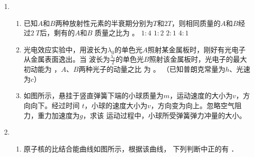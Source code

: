 



\begin{enumerate}
	\item
{}
\begin{enumerate}
	\item
已知$ A $和$ B $两种放射性元素的半衰期分别为$ T $和$ 2 T $，则相同质量的$ A $和$ B $经过$ 2 \ T $后，剩有的$ A $和$ B $
质量之比为  \underlinegap 。
\fourchoices
{$ 1:4 $}
{$ 1:2 $}
{$ 2:1 $}
{$ 4:1 $}



\item 
光电效应实验中，用波长为$ \lambda _{0} $的单色光$ A $照射某金属板时，刚好有光电子从金属表面逸出。当
波长为$ \frac{\lambda_{0}}{2} $的单色光$ B $照射该金属板时，光电子的最大初动能为 \underlinegap ，$ A $、$ B $两种光子的动量之比
为  \underlinegap 。 （已知普朗克常量为$ h $、光速为$ c $）

	



\item 
如图所示，悬挂于竖直弹簧下端的小球质量为$ m $，运动速度的大小为$ v $，方向向下。经过时间
$ t $，小球的速度大小为$ v $，方向变为向上。忽略空气阻力，重力加速度为$ g $，求该
运动过程中，小球所受弹簧弹力冲量的大小。
\begin{figure}[h!]
	\flushright
	
\end{figure}




\end{enumerate}






\item
{}
\begin{enumerate}
	\item
原子核的比结合能曲线如图所示，根据该曲线，
下列判断中正的有 \underlinegap ．
\begin{figure}[h!]
	\centering
	
\end{figure}




\end{enumerate}
\end{enumerate}
